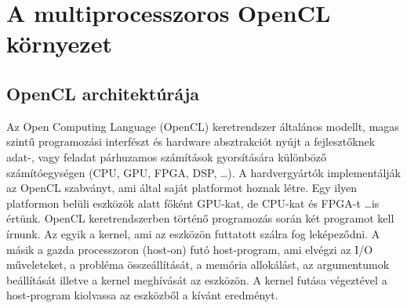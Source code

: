 \chapter{A multiprocesszoros OpenCL környezet} \label{sec:opencl}

\section{OpenCL architektúrája}
	Az Open Computing Language (OpenCL) keretrendszer \cite{opencl}
	általános modellt, magas szintű programozási interfészt és hardware
	absztrakciót nyújt a fejlesztőknek adat-, vagy feladat párhuzamos számítások gyorsítására különböző
	számítóegységen (CPU, GPU, FPGA, DSP, \ldots).
	A hardvergyártók implementálják az OpenCL szabványt, ami által saját platformot
	hoznak létre. Egy ilyen platformon belüli eszközök alatt főként GPU-kat, de
	CPU-kat és FPGA-t \ldots is értünk.
	OpenCL keretrendszerben történő programozás során két programot kell írnunk.
	Az egyik a kernel, ami az eszközön futtatott szálra fog leképeződni.
	A másik a gazda processzoron (host-on) futó host-program, ami elvégzi az I/O műveleteket,
	a probléma összeállítását, a memória allokálást, az argumentumok beállítását
	illetve a kernel meghívását az eszközön.
	A kernel futása végeztével a host-program kiolvassa az eszközből
	a kívánt eredményt.
	
